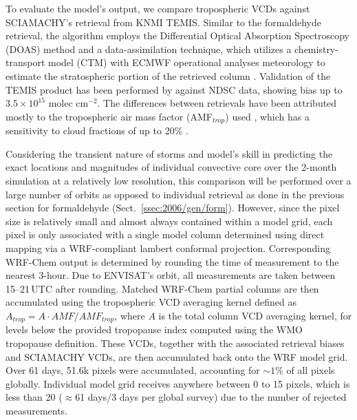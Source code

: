 To evaluate the model's output, we compare tropospheric  VCDs against SCIAMACHY's retrieval from KNMI TEMIS. Similar to the formaldehyde retrieval, the algorithm employs the
Differential Optical Absorption Spectroscopy (DOAS) method and a data-assimilation technique, which utilizes a chemistry-transport model (CTM) with ECMWF operational analyses meteorology to
estimate the stratospheric portion of the retrieved column \citep{Boersma:2004uq}. Validation of the TEMIS  product has been performed by \citet{Lambert:2004aa} against NDSC data,
showing bias up to $3.5\times10^{15}$ molec cm$^{-2}$. The differences between retrievals have been attributed mostly to the tropospheric air mass factor (AMF$_{trop}$) used \citep{vanderA:2010aa},
which has a sensitivity to cloud fractions of up to 20\% \citep{Boersma:2004uq}.


Considering the transient nature of storms and model's skill in predicting the exact locations and magnitudes of individual convective core over the 2-month simulation at a relatively low resolution, this
comparison will be performed over a large number of orbits as opposed to individual retrieval as done in the previous section for formaldehyde (Sect.~\ref{ssec:2006/gen/form}). However, since the
pixel size is relatively small and almost always contained within a model grid, each pixel is only associated with a single model column determined using direct mapping via a WRF-compliant lambert
conformal projection. Corresponding WRF-Chem output is determined by rounding the time of measurement to the nearest 3-hour. Due to ENVISAT's orbit, all measurements are taken between
15--21\,\unit{UTC} after rounding. Matched WRF-Chem  partial columns are then accumulated using the tropospheric VCD averaging kernel defined as $A_{trop} = A\cdot AMF/AMF_{trop}$,
where $A$ is the total column VCD averaging kernel, for levels below the provided tropopause index computed using the WMO tropopause definition. These VCDs, together with the associated
retrieval biases and SCIAMACHY VCDs,  are then accumulated back onto the WRF model grid. Over 61 days, 51.6k pixels were accumulated, accounting for $\sim1\%$ of all pixels globally. Individual
model grid receives anywhere between 0 to 15 pixels, which is less than 20 ($\approx$61 days/3 days per global survey) due to the number of rejected measurements.

